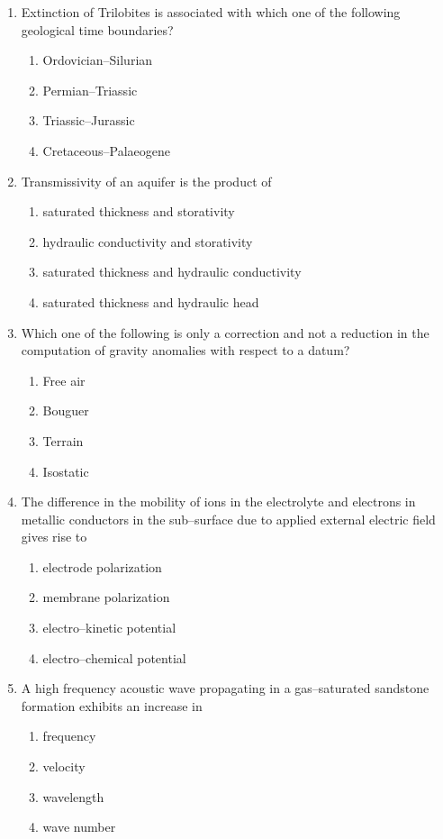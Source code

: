 \documentclass[journal,12pt,onecolumn]{IEEEtran}
\theoremstyle{remark}
\begin{document}
\begin{enumerate}[resume]
\item Extinction of Trilobites is associated with which one of the following geological time boundaries?  
\begin{enumerate}
\item Ordovician--Silurian
\item Permian--Triassic
\item Triassic--Jurassic
\item Cretaceous--Palaeogene
\end{enumerate}

\item Transmissivity of an aquifer is the product of  
\begin{enumerate}
\item saturated thickness and storativity
\item hydraulic conductivity and storativity
\item saturated thickness and hydraulic conductivity
\item saturated thickness and hydraulic head
\end{enumerate}

\item Which one of the following is only a correction and not a reduction in the computation of gravity anomalies with respect to a datum?  
\begin{multicols}{4}
\begin{enumerate}
\item Free air
\item Bouguer
\item Terrain
\item Isostatic
\end{enumerate}
\end{multicols}


\item The difference in the mobility of ions in the electrolyte and electrons in metallic conductors in the sub--surface due to applied external electric field gives rise to  
\begin{enumerate}
\item electrode polarization
\item membrane polarization
\item electro--kinetic potential
\item electro--chemical potential
\end{enumerate}

\item A high frequency acoustic wave propagating in a gas--saturated sandstone formation exhibits an increase in  
\begin{multicols}{4}
\begin{enumerate}
\item frequency
\item velocity
\item wavelength
\item wave number
\end{enumerate}
\end{multicols}


\end{enumerate}
\end{document}
